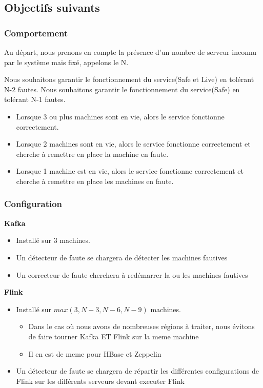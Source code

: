 \documentclass[a4paper,oneside,10pt]{article}
\begin{document}
\subsection{Objectifs suivants}

\subsubsection{Comportement}

Au départ, nous prenons en compte la présence d'un nombre de serveur inconnu par le système mais fixé, appelons le N.

Nous souhaitons garantir le fonctionnement du service(Safe et Live) en tolérant N-2 fautes.
Nous souhaitons garantir le fonctionnement du service(Safe) en tolérant N-1 fautes. 

\begin{itemize}
	\item Lorsque 3 ou plus machines sont en vie, alors le service fonctionne correctement.
	\item Lorsque 2 machines sont en vie, alors le service fonctionne correctement et cherche à remettre en place la machine en faute.
	\item Lorsque 1 machine est en vie, alors le service fonctionne correctement et cherche à remettre en place les machines en faute. 
\end{itemize}


\subsubsection{Configuration}


\textbf{Kafka}
\begin{itemize}
	\item Installé sur 3 machines. 
	\item Un détecteur de faute se chargera de détecter les machines fautives
	\item Un correcteur de faute cherchera à redémarrer la ou les machines fautives
\end{itemize}

\textbf{Flink}
\begin{itemize}
	\item Installé sur $max(3, N-3, N-6, N-9)$ machines. 
	\begin{itemize}
		\item Dans le cas où nous avons de nombreuses régions à traiter, nous évitons de faire tourner Kafka ET Flink sur la meme machine
		\item Il en est de meme pour HBase et Zeppelin
	\end{itemize}
	\item Un détecteur de faute se chargera de répartir les différentes configurations de Flink sur les différents serveurs devant executer Flink
\end{itemize}
\end{document}
